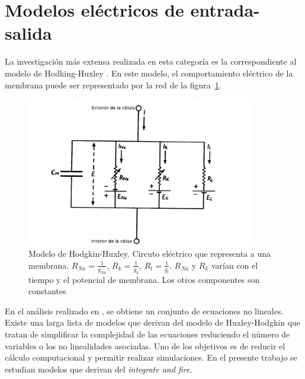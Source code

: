 \section{Modelos eléctricos de entrada-salida}
La investigación más extensa realizada en esta categoría es la correspondiente al modelo de Hodking-Huxley \cite{HODGKIN1952}. En este modelo, el comportamiento eléctrico de la membrana puede ser representado por la red de la figura~\ref{fig:circuito_electrico_hodking_huxley}. 
\begin{figure}[htbp!]
    \centering
    \includegraphics[width=10cm]{figures/Modelo_Hodking_Huxley+.png}
    \caption{Modelo de Hodgkin-Huxley. Circuto eléctrico que representa a una membrana. $R_{Na}=\frac{1}{g_{Na}}$, $R_{k}=\frac{1}{g_{k}}$, $R_{l}=\frac{1}{g_{l}}$. $R_{Na}$ y $R_k$ varían con el tiempo y el potencial de membrana. Los otros componentes son constantes}
    \label{fig:circuito_electrico_hodking_huxley}
\end{figure}
En el análisis realizado en \cite{HODGKIN1952}, se obtiene un conjunto de ecuaciones no lineales.
Existe una larga lista de modelos que derivan del modelo de Huxley-Hodgkin que tratan de simplificar la complejidad de las ecuaciones reduciendo el número de variables o los no linealidades asociadas. Uno de los objetivos es de reducir el cálculo computacional y permitir realizar simulaciones. En el presente trabajo se estudian modelos que derivan del \textit{integrate and fire}.
